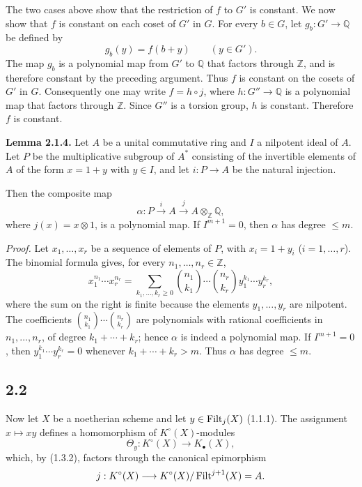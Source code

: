 The two cases above show that the restriction of $f$ to $G'$ is constant.
We now show that $f$ is constant on each coset of $G'$ in $G$. For every
$b\in G$, let $g_b:G'\to\mathbb Q$ be defined by
\[
g_b(y)=f(b+y)\qquad(y\in G').
\]
The map $g_b$ is a polynomial map from $G'$ to $\mathbb Q$ that factors
through $\mathbb Z$, and is therefore constant by the preceding argument.
Thus $f$ is constant on the cosets of $G'$ in $G$. Consequently one may
write $f=h\circ j$, where $h:G''\to\mathbb Q$ is a polynomial map that
factors through $\mathbb Z$. Since $G''$ is a torsion group, $h$ is constant.
Therefore $f$ is constant.

\textbf{Lemma 2.1.4.}
Let $A$ be a unital commutative ring and $I$ a nilpotent ideal of $A$. Let
$P$ be the multiplicative subgroup of $A^*$ consisting of the invertible elements
of $A$ of the form $x=1+y$ with $y\in I$, and let $i:P\to A$ be the natural
injection.

Then the composite map
\[
\alpha:P\xrightarrow{i}A\xrightarrow{j}A\otimes_{\mathbb Z}\mathbb Q,
\]
where $j(x)=x\otimes1$, is a polynomial map. If $I^{m+1}=0$, then $\alpha$
has degree $\leq m$.

\emph{Proof.}
Let $x_1,\ldots,x_r$ be a sequence of elements of $P$, with
$x_i=1+y_i$ ($i=1,\ldots,r$). The binomial formula gives, for every
$n_1,\ldots,n_r\in\mathbb Z$,
\begin{equation}\tag{2.1.5}
x_1^{n_1}\cdots x_r^{n_r}=
\sum_{k_1,\ldots,k_r\geq0}
\binom{n_1}{k_1}\cdots\binom{n_r}{k_r}
y_1^{k_1}\cdots y_r^{k_r},
\end{equation}
where the sum on the right is finite because the elements
$y_1,\ldots,y_r$ are nilpotent. The coefficients
$\binom{n_1}{k_1}\cdots\binom{n_r}{k_r}$ are polynomials with rational
coefficients in $n_1,\ldots,n_r$, of degree $k_1+\cdots+k_r$; hence
$\alpha$ is indeed a polynomial map. If $I^{m+1}=0$, then
$y_1^{k_1}\cdots y_r^{k_r}=0$ whenever $k_1+\cdots+k_r>m$. Thus $\alpha$
has degree $\leq m$.

\subsection*{2.2}
Now let $X$ be a noetherian scheme and let $y\in\operatorname{Filt}_j(X)$ (1.1.1). The
assignment $x\mapsto xy$ defines a homomorphism of $K^\circ(X)$-modules
\[
\Theta_y:K^\circ(X)\longrightarrow K_\bullet(X),
\]
which, by (1.3.2), factors through the canonical epimorphism
\[
j:K^\circ(X)\longrightarrow
K^\circ(X)/\operatorname{Filt}^{j+1}(X)=A.
\]

